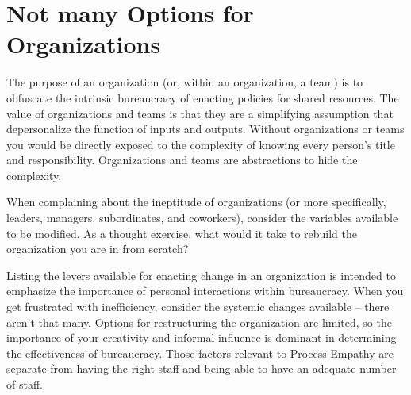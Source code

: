 \section{Not many Options for Organizations}

The purpose of an organization (or, within an organization, a team) is to obfuscate the intrinsic bureaucracy of enacting policies for shared resources. The value of organizations and teams is that they are a simplifying assumption that depersonalize the function of inputs and outputs. Without organizations or teams you would be directly exposed to the complexity of knowing every person's title and responsibility. Organizations and teams are abstractions to hide the complexity.

When complaining about the ineptitude of organizations (or more specifically, leaders, managers, subordinates, and coworkers), consider the variables available to be modified. As a thought exercise, what would it take to rebuild the organization you are in from scratch? 

Listing the levers available for enacting change in an organization is intended to emphasize the importance of personal interactions within bureaucracy. When you get frustrated with inefficiency, consider the systemic changes available -- there aren't that many. Options for restructuring the organization are limited, so the importance of your creativity and informal influence is dominant in determining the effectiveness of bureaucracy. Those factors relevant to Process Empathy are separate from having the right staff and being able to have an adequate number of staff. 


